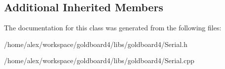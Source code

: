 \subsection*{Additional Inherited Members}


The documentation for this class was generated from the following files\+:\begin{DoxyCompactItemize}
\item 
/home/alex/workspace/goldboard4/libs/goldboard4/Serial.\+h\item 
/home/alex/workspace/goldboard4/libs/goldboard4/Serial.\+cpp\end{DoxyCompactItemize}
